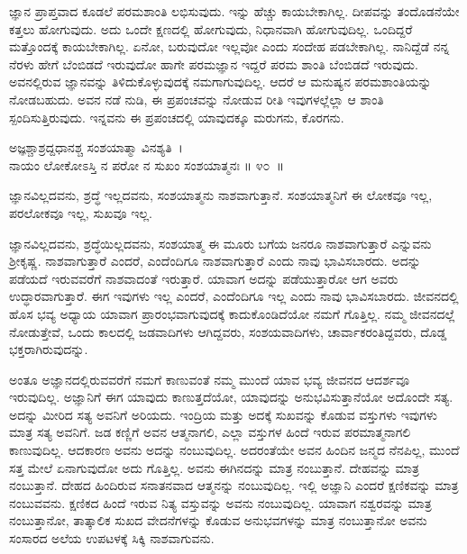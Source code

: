 ಜ್ಞಾನ ಪ್ರಾಪ್ತವಾದ ಕೂಡಲೆ ಪರಮಶಾಂತಿ ಲಭಿಸುವುದು. ಇನ್ನು ಹೆಚ್ಚು ಕಾಯಬೇಕಾಗಿಲ್ಲ. ದೀಪವನ್ನು ತಂದೊಡನೆಯೇ ಕತ್ತಲು ಹೋಗುವುದು. ಅದು ಒಂದೇ ಕ್ಷಣದಲ್ಲಿ ಹೋಗುವುದು, ನಿಧಾನವಾಗಿ ಹೋಗುವುದಿಲ್ಲ. ಒಂದಿದ್ದರೆ ಮತ್ತೊಂದಕ್ಕೆ ಕಾಯಬೇಕಾಗಿಲ್ಲ. ಏನೋ, ಬರುವುದೋ ಇಲ್ಲವೋ ಎಂದು ಸಂದೇಹ ಪಡಬೇಕಾಗಿಲ್ಲ. ನಾನಿದ್ದೆಡೆ ನನ್ನ ನೆರಳು ಹೇಗೆ ಬೆಂಬಿಡದೆ ಇರುವುದೋ ಹಾಗೇ ಪರಮಜ್ಞಾನ ಇದ್ದರೆ ಪರಮ ಶಾಂತಿ ಬೆಂಬಿಡದೆ ಇರುವುದು. ಅವನಲ್ಲಿರುವ ಜ್ಞಾನವನ್ನು ತಿಳಿದುಕೊಳ್ಳುವುದಕ್ಕೆ ನಮಗಾಗುವುದಿಲ್ಲ. ಆದರೆ ಆ ಮನುಷ್ಯನ ಪರಮಶಾಂತಿಯನ್ನು ನೋಡಬಹುದು. ಅವನ ನಡೆ ನುಡಿ, ಈ ಪ್ರಪಂಚವನ್ನು ನೋಡುವ ರೀತಿ ಇವುಗಳಲ್ಲೆಲ್ಲಾ ಆ ಶಾಂತಿ ಸ್ಪಂದಿಸುತ್ತಿರುವುದು. ಇನ್ನವನು ಈ ಪ್ರಪಂಚದಲ್ಲಿ ಯಾವುದಕ್ಕೂ ಮರುಗನು, ಕೊರಗನು.

\begin{shloka}
ಅಜ್ಞಶ್ಚಾಶ್ರದ್ದಧಾನಶ್ಚ ಸಂಶಯಾತ್ಮಾ ವಿನಶ್ಯತಿ~।\\ನಾಯಂ ಲೋಕೋಽಸ್ತಿ ನ ಪರೋ ನ ಸುಖಂ ಸಂಶಯಾತ್ಮನಃ \hfill॥ ೪೦~॥
\end{shloka}

\begin{artha}
ಜ್ಞಾನವಿಲ್ಲದವನು, ಶ್ರದ್ಧೆ ಇಲ್ಲದವನು, ಸಂಶಯಾತ್ಮನು ನಾಶವಾಗುತ್ತಾನೆ. ಸಂಶಯಾತ್ಮನಿಗೆ ಈ ಲೋಕವೂ ಇಲ್ಲ, ಪರಲೋಕವೂ ಇಲ್ಲ, ಸುಖವೂ ಇಲ್ಲ.
\end{artha}

\newpage

ಜ್ಞಾನವಿಲ್ಲದವನು, ಶ್ರದ್ಧೆಯಿಲ್ಲದವನು, ಸಂಶಯಾತ್ಮ ಈ ಮೂರು ಬಗೆಯ ಜನರೂ ನಾಶ\-ವಾಗುತ್ತಾರೆ ಎನ್ನುವನು ಶ‍್ರೀಕೃಷ್ಣ. ನಾಶವಾಗುತ್ತಾರೆ ಎಂದರೆ, ಎಂದೆಂದಿಗೂ ನಾಶವಾಗುತ್ತಾರೆ ಎಂದು ನಾವು ಭಾವಿಸಬಾರದು. ಅದನ್ನು ಪಡೆಯದೆ ಇರುವವರೆಗೆ ನಾಶವಾದಂತೆ ಇರುತ್ತಾರೆ. ಯಾವಾಗ ಅದನ್ನು ಪಡೆಯುತ್ತಾರೋ ಆಗ ಅವರು ಉದ್ಧಾರವಾಗುತ್ತಾರೆ. ಈಗ ಇವುಗಳು ಇಲ್ಲ ಎಂದರೆ, ಎಂದೆಂದಿಗೂ ಇಲ್ಲ ಎಂದು ನಾವು ಭಾವಿಸಬಾರದು. ಜೀವನದಲ್ಲಿ ಹೊಸ ಭವ್ಯ ಅಧ್ಯಾಯ ಯಾವಾಗ ಪ್ರಾರಂಭವಾಗುವುದಕ್ಕೆ ಕಾದುಕೊಂಡಿದೆಯೋ ನಮಗೆ ಗೊತ್ತಿಲ್ಲ. ನಮ್ಮ ಜೀವನದಲ್ಲೆ ನೋಡುತ್ತೇವೆ, ಒಂದು ಕಾಲದಲ್ಲಿ ಜಡವಾದಿಗಳು ಆಗಿದ್ದವರು, ಸಂಶಯವಾದಿಗಳು, ಚಾರ್ವಾಕರಂತಿದ್ದವರು, ದೊಡ್ಡ ಭಕ್ತರಾಗಿರುವುದನ್ನು.

ಅಂತೂ ಅಜ್ಞಾನದಲ್ಲಿರುವವರೆಗೆ ನಮಗೆ ಕಾಣುವಂತೆ ನಮ್ಮ ಮುಂದೆ ಯಾವ ಭವ್ಯ ಜೀವನದ ಆದರ್ಶವೂ ಇರುವುದಿಲ್ಲ. ಅಜ್ಞಾನಿಗೆ ಈಗ ಯಾವುದು ಕಾಣುತ್ತದೆಯೋ, ಯಾವುದನ್ನು ಅನುಭವಿಸುತ್ತಾನೆಯೋ ಅದೊಂದೇ ಸತ್ಯ. ಅದನ್ನು ಮೀರಿದ ಸತ್ಯ ಅವನಿಗೆ ಅರಿಯದು. ಇಂದ್ರಿಯ ಮತ್ತು ಅದಕ್ಕೆ ಸುಖವನ್ನು ಕೊಡುವ ವಸ್ತುಗಳು ಇವುಗಳು ಮಾತ್ರ ಸತ್ಯ ಅವನಿಗೆ. ಜಡ ಕಣ್ಣಿಗೆ ಅವನ ಆತ್ಮನಾಗಲಿ, ಎಲ್ಲಾ ವಸ್ತುಗಳ ಹಿಂದೆ ಇರುವ ಪರಮಾತ್ಮನಾಗಲಿ ಕಾಣುವುದಿಲ್ಲ. ಆದಕಾರಣ ಅವನು ಅದನ್ನು ನಂಬುವುದಿಲ್ಲ. ಅದರಂತೆಯೇ ಅವನ ಹಿಂದಿನ ಜನ್ಮದ ನೆನಪಿಲ್ಲ, ಮುಂದೆ ಸತ್ತ ಮೇಲೆ ಏನಾಗುವುದೋ ಅದು ಗೊತ್ತಿಲ್ಲ. ಅವನು ಈಗಿನದನ್ನು ಮಾತ್ರ ನಂಬುತ್ತಾನೆ. ದೇಹವನ್ನು ಮಾತ್ರ ನಂಬುತ್ತಾನೆ. ದೇಹದ ಹಿಂದಿರುವ ಸನಾತನವಾದ ಆತ್ಮನನ್ನು ನಂಬುವುದಿಲ್ಲ. ಇಲ್ಲಿ ಅಜ್ಞಾನಿ ಎಂದರೆ ಕ್ಷಣಿಕವನ್ನು ಮಾತ್ರ ನಂಬುವವನು. ಕ್ಷಣಿಕದ ಹಿಂದೆ ಇರುವ ನಿತ್ಯ ವಸ್ತುವನ್ನು ಅವನು ನಂಬುವುದಿಲ್ಲ. ಯಾವಾಗ ನಶ್ವರವನ್ನು ಮಾತ್ರ ನಂಬುತ್ತಾನೋ, ತಾತ್ಕಾಲಿಕ ಸುಖದ ವೇದನೆಗಳನ್ನು ಕೊಡುವ ಅನುಭವಗಳನ್ನು ಮಾತ್ರ ನಂಬುತ್ತಾನೋ ಅವನು ಸಂಸಾರದ ಅಲೆಯ ಉಪಟಳಕ್ಕೆ ಸಿಕ್ಕಿ ನಾಶವಾಗುವನು.

